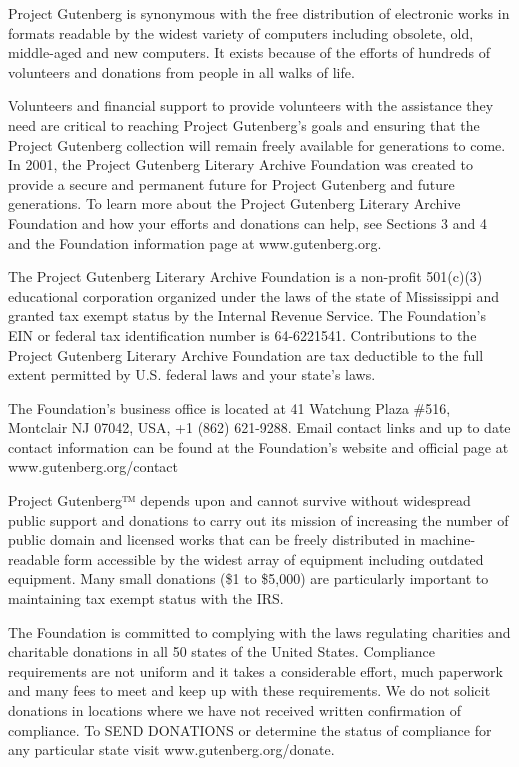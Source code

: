 \documentclass[12pt,openright]{book}
\begin{document}
Project Gutenberg is synonymous with the free distribution of electronic works in formats readable by the widest variety of computers including obsolete, old, middle-aged and new computers. It exists because of the efforts of hundreds of volunteers and donations from people in all walks of life.

Volunteers and financial support to provide volunteers with the assistance they need are critical to reaching Project Gutenberg’s goals and ensuring that the Project Gutenberg collection will remain freely available for generations to come. In 2001, the Project Gutenberg Literary Archive Foundation was created to provide a secure and permanent future for Project Gutenberg and future generations. To learn more about the Project Gutenberg Literary Archive Foundation and how your efforts and donations can help, see Sections 3 and 4 and the Foundation information page at www.gutenberg.org.

The Project Gutenberg Literary Archive Foundation is a non-profit 501(c)(3) educational corporation organized under the laws of the state of Mississippi and granted tax exempt status by the Internal Revenue Service. The Foundation’s EIN or federal tax identification number is 64-6221541. Contributions to the Project Gutenberg Literary Archive Foundation are tax deductible to the full extent permitted by U.S. federal laws and your state’s laws.

The Foundation’s business office is located at 41 Watchung Plaza \#516, Montclair NJ 07042, USA, +1 (862) 621-9288. Email contact links and up to date contact information can be found at the Foundation’s website and official page at www.gutenberg.org/contact

Project Gutenberg™ depends upon and cannot survive without widespread public support and donations to carry out its mission of increasing the number of public domain and licensed works that can be freely distributed in machine-readable form accessible by the widest array of equipment including outdated equipment. Many small donations (\$1 to \$5,000) are particularly important to maintaining tax exempt status with the IRS.

The Foundation is committed to complying with the laws regulating charities and charitable donations in all 50 states of the United States. Compliance requirements are not uniform and it takes a considerable effort, much paperwork and many fees to meet and keep up with these requirements. We do not solicit donations in locations where we have not received written confirmation of compliance. To SEND DONATIONS or determine the status of compliance for any particular state visit www.gutenberg.org/donate.
\end{document}
